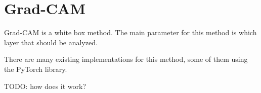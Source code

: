 \section{Grad-CAM}
Grad-CAM is a white box method. The main parameter for this method is which layer that should be analyzed.

There are many existing implementations for this method, some of them using the PyTorch library.

TODO: how does it work?